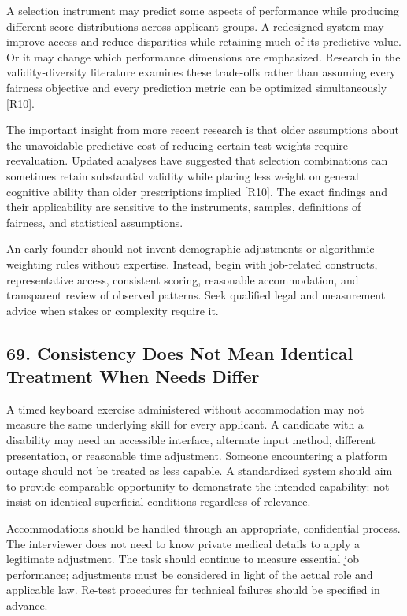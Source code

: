 A selection instrument may predict some aspects of performance while producing different score distributions across applicant groups. A redesigned system may improve access and reduce disparities while retaining much of its predictive value. Or it may change which performance dimensions are emphasized. Research in the validity-diversity literature examines these trade-offs rather than assuming every fairness objective and every prediction metric can be optimized simultaneously [R10].

The important insight from more recent research is that older assumptions about the unavoidable predictive cost of reducing certain test weights require reevaluation. Updated analyses have suggested that selection combinations can sometimes retain substantial validity while placing less weight on general cognitive ability than older prescriptions implied [R10]. The exact findings and their applicability are sensitive to the instruments, samples, definitions of fairness, and statistical assumptions.

An early founder should not invent demographic adjustments or algorithmic weighting rules without expertise. Instead, begin with job-related constructs, representative access, consistent scoring, reasonable accommodation, and transparent review of observed patterns. Seek qualified legal and measurement advice when stakes or complexity require it.

\subsection*{69. Consistency Does Not Mean Identical Treatment When Needs Differ}

A timed keyboard exercise administered without accommodation may not measure the same underlying skill for every applicant. A candidate with a disability may need an accessible interface, alternate input method, different presentation, or reasonable time adjustment. Someone encountering a platform outage should not be treated as less capable. A standardized system should aim to provide comparable opportunity to demonstrate the intended capability: not insist on identical superficial conditions regardless of relevance.

Accommodations should be handled through an appropriate, confidential process. The interviewer does not need to know private medical details to apply a legitimate adjustment. The task should continue to measure essential job performance; adjustments must be considered in light of the actual role and applicable law. Re-test procedures for technical failures should be specified in advance.

